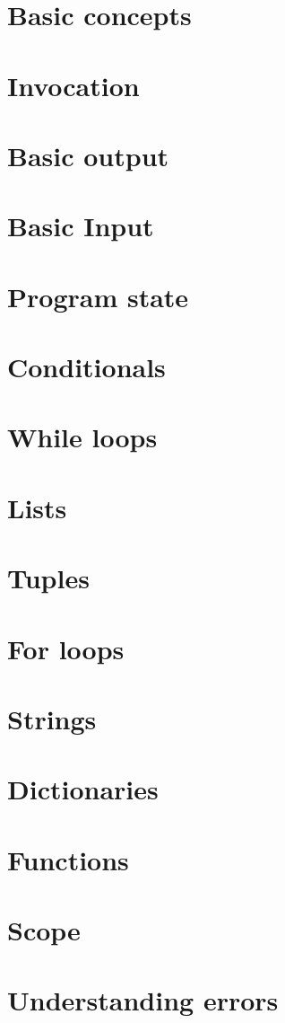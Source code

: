 \documentclass[a4paper,11pt]{report}
\title{}
\begin{document}

\chapter{Basic concepts}
    
\chapter{Invocation}
    
\chapter{Basic output}
    
\chapter{Basic Input}
    
\chapter{Program state}
    
\chapter{Conditionals}
    
\chapter{While loops}
    
\chapter{Lists}
    
\chapter{Tuples}
    
\chapter{For loops}
    
\chapter{Strings}
    
\chapter{Dictionaries}
    
\chapter{Functions}
    
\chapter{Scope}
    
%    
\chapter{Understanding errors}
    
\end{document}
